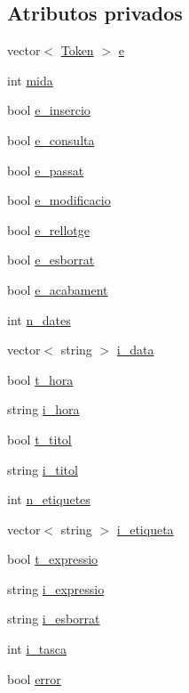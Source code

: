 \subsection*{Atributos privados}
\begin{DoxyCompactItemize}
\item 
vector$<$ \hyperlink{class_token}{Token} $>$ \hyperlink{class_comanda_a4792137ffe62e366d017c085798e1de7}{e}
\item 
int \hyperlink{class_comanda_abaf613f247586557027ad5857ace89c2}{mida}
\item 
bool \hyperlink{class_comanda_afa50474d0c9c08da1f3042cfddc9df24}{e\-\_\-insercio}
\item 
bool \hyperlink{class_comanda_a558a2944c2306c12df9f889fc96a58dd}{e\-\_\-consulta}
\item 
bool \hyperlink{class_comanda_a38e7cdf2003076cbe88461f03dc2106c}{e\-\_\-passat}
\item 
bool \hyperlink{class_comanda_a96d917429f6bfa73608d745ad1e1dfc7}{e\-\_\-modificacio}
\item 
bool \hyperlink{class_comanda_ad73910246f9c47c887a3c01b53350282}{e\-\_\-rellotge}
\item 
bool \hyperlink{class_comanda_a70a9790e90a45015dbcd4c6700ec0812}{e\-\_\-esborrat}
\item 
bool \hyperlink{class_comanda_a0f7472af37d7f6c24f74fbac60e4a696}{e\-\_\-acabament}
\item 
int \hyperlink{class_comanda_a0a4e13d8edba10c69d1b058d8fc6a7c3}{n\-\_\-dates}
\item 
vector$<$ string $>$ \hyperlink{class_comanda_a06ee1d3173ee0ae52c588689e9263099}{i\-\_\-data}
\item 
bool \hyperlink{class_comanda_ae481194a2016e940e655173e897d214d}{t\-\_\-hora}
\item 
string \hyperlink{class_comanda_a480a34460b3668a5b4a1fa7e796632db}{i\-\_\-hora}
\item 
bool \hyperlink{class_comanda_a08e8674396e2125cf8b2900f289713a7}{t\-\_\-titol}
\item 
string \hyperlink{class_comanda_aca04e90eab5ac14ddc3b25f154aabe48}{i\-\_\-titol}
\item 
int \hyperlink{class_comanda_a1e525815f0745140e05da2ebb96ec39a}{n\-\_\-etiquetes}
\item 
vector$<$ string $>$ \hyperlink{class_comanda_a1d193f66ea6d2681ab79a16192da3114}{i\-\_\-etiqueta}
\item 
bool \hyperlink{class_comanda_ac7037525fc1cd9f49b02bd87cf4b6123}{t\-\_\-expressio}
\item 
string \hyperlink{class_comanda_a9236cdc5142b6a9f4116673abce06508}{i\-\_\-expressio}
\item 
string \hyperlink{class_comanda_a269a43d5b283a23792791a2ba67747b0}{i\-\_\-esborrat}
\item 
int \hyperlink{class_comanda_aab152fe48a937f449c027a2274fc31e7}{i\-\_\-tasca}
\item 
bool \hyperlink{class_comanda_a9a1bf4bf74940a4bac90140e67d11972}{error}
\end{DoxyCompactItemize}
